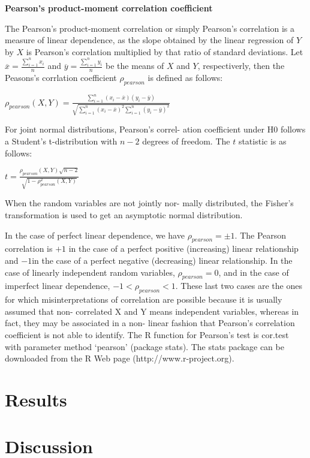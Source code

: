\documentclass[a4paper]{article}
\begin{document}
\textbf{Pearson’s product-moment correlation coefficient}

The Pearson’s product-moment correlation or simply Pearson’s correlation is a measure of linear dependence, as the slope obtained by the linear regression of $Y$ by $X$ is Pearson’s correlation multiplied by that ratio of standard deviations.
Let $\overline{x} = \frac{\sum_{i=1}^{n} x_{i}}{n}$ and $\overline{y} = \frac{\sum_{i=1}^{n} y_{i}}{n}$ be the means of $X$ and $Y$, respectiverly, then the Peasons's corrlation coefficient $\rho_{pearson}$ is defined as follows: 

$\rho_{pearson}(X, Y) = \frac{\sum_{i=1}^{n}(x_{i} - \overline{x})(y_{i} - \overline{y})}
{\sqrt{\sum_{i=1}^{n}(x_{i} - \overline{x})^2  \sum_{i=1}^{n}(y_{i} - \overline{y})^2}}$


For joint normal distributions, Pearson’s correl- ation coefficient under H0 follows a Student’s t-distribution with $ n -2 $ degrees of freedom. The $t$ statistic is as follows:

$t = \frac{\rho_{pearson}(X, Y) \sqrt{n -2}}{\sqrt{1- \rho^{2}_{pearson}(X, Y)}}$

When the random variables are not jointly nor- mally distributed, the Fisher’s transformation is used to get an asymptotic normal distribution.

In the case of perfect linear dependence, we have $\rho_{pearson} = \pm1$. The Pearson correlation is $+1$ in the case of a perfect positive (increasing) linear relationship and $-1 $in the case of a perfect negative (decreasing) linear relationship. In the case of linearly independent random variables, $\rho_{pearson} = 0$, and in the case of imperfect linear dependence, $-1 < \rho_{pearson} < 1$. These last two cases are the ones for which misinterpretations of correlation are possible because it is usually assumed that non- correlated X and Y means independent variables, whereas in fact, they may be associated in a non- linear fashion that Pearson’s correlation coefficient is not able to identify.
The R function for Pearson’s test is cor.test with parameter method `pearson' (package stats). The stats package can be downloaded from the R  Web page (http://www.r-project.org).

\section*{Results}

\section*{Discussion}


\end{document}

